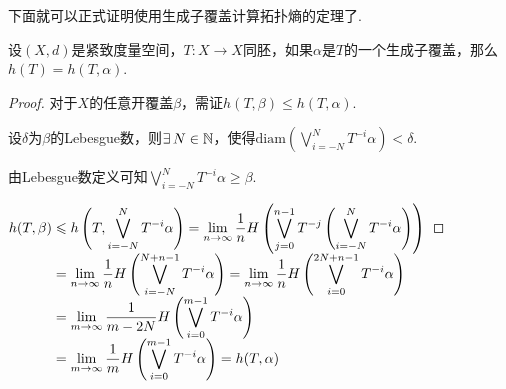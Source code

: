 下面就可以正式证明使用生成子覆盖计算拓扑熵的定理了.
\begin{theorem}{}
    设$(X,d)$是紧致度量空间，$T:X\to X$同胚，如果$\alpha$是$T$的一个生成子覆盖，那么$h(T)=h(T,\alpha)$.
\end{theorem}
\begin{proof}
    对于$X$的任意开覆盖$\beta$，需证$h(T,\beta)\leq h(T,\alpha)$.\par
    设$\delta$为$\beta$的Lebesgue数，则$\exists\, N\in\mathbb{N}$，使得$\mathrm{diam}\left(\bigvee_{i=-N}^NT^{-i}\alpha\right)<\delta$.\par
    由Lebesgue数定义可知$\bigvee_{i=-N}^NT^{-i}\alpha\geq\beta$.\par
    $\setjot[-2]\begin{aligned}[t]
        h(T,\beta) &\leq h\left(T,\bigvee_{i=-N}^NT^{-i}\alpha\right)=\lim_{n\to\infty}{\frac{1}{n}H\left(\bigvee_{j=0}^{n-1}T^{-j}\left(\bigvee_{i=-N}^NT^{-i}\alpha\right)\right)} \\
        &=\lim_{n\to\infty}{\frac{1}{n}H\left(\bigvee_{i=-N}^{N+n-1}T^{-i}\alpha\right)}=\lim_{n\to\infty}{\frac{1}{n}H\left(\bigvee_{i=0}^{2N+n-1}T^{-i}\alpha\right)}\\
        &=\lim_{m\to\infty}{\frac{1}{m-2N}H\left(\bigvee_{i=0}^{m-1}T^{-i}\alpha\right)} \\
        & =\lim_{m\to\infty}{\frac{1}{m}H\left(\bigvee_{i=0}^{m-1}T^{-i}\alpha\right)}=h(T,\alpha)   
    \end{aligned}$
\end{proof}


